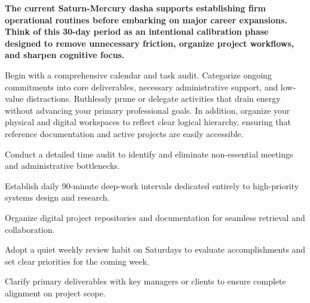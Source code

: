 
\label{topic68}

{\fontsize{9.5}{13.8}\selectfont\bfseries\color{DeepSlate} The current Saturn-Mercury dasha supports establishing firm operational routines before embarking on major career expansions. Think of this 30-day period as an intentional calibration phase designed to remove unnecessary friction, organize project workflows, and sharpen cognitive focus.}\par\vspace{2mm}

{\fontsize{9}{13}\selectfont Begin with a comprehensive calendar and task audit. Categorize ongoing commitments into core deliverables, necessary administrative support, and low-value distractions. Ruthlessly prune or delegate activities that drain energy without advancing your primary professional goals. In addition, organize your physical and digital workspaces to reflect clear logical hierarchy, ensuring that reference documentation and active projects are easily accessible.}\par\vspace{1.8mm}

\begin{diamondlist}
  \item {\fontsize{8.5}{12}\selectfont Conduct a detailed time audit to identify and eliminate non-essential meetings and administrative bottlenecks.}
  \item {\fontsize{8.5}{12}\selectfont Establish daily 90-minute deep-work intervals dedicated entirely to high-priority systems design and research.}
  \item {\fontsize{8.5}{12}\selectfont Organize digital project repositories and documentation for seamless retrieval and collaboration.}
  \item {\fontsize{8.5}{12}\selectfont Adopt a quiet weekly review habit on Saturdays to evaluate accomplishments and set clear priorities for the coming week.}
  \item {\fontsize{8.5}{12}\selectfont Clarify primary deliverables with key managers or clients to ensure complete alignment on project scope.}
\end{diamondlist}

